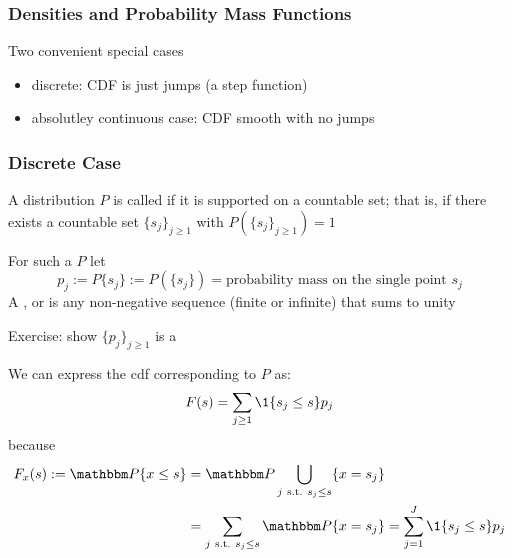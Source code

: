 \begin{frame}

    \frametitle{Densities and Probability Mass Functions}

    Two convenient special cases
    \begin{itemize}
        \item discrete: CDF is just jumps (a step function) 
        \item absolutley continuous case: CDF smooth with no jumps
    \end{itemize}

\end{frame}

\begin{frame}\frametitle{Discrete Case}
    
    \vspace{2em}
    A distribution $P$ is called  if it is supported on a countable
    set; that is, if there exists a countable set $\{s_j\}_{j \geq 1}$ with
    $P(\{s_j\}_{j \geq 1}) = 1$
    
    For such a $P$ let
    \begin{equation*}
        p_j 
        := P\{s_j\} 
        := P(\{s_j\})
        = \text{probability mass on the single point } s_j
    \end{equation*}
    A
    , or  is any non-negative
    sequence (finite or infinite) that sums to unity
    
    Exercise: show $\{p_j\}_{j \geq 1}$ is a
    
\end{frame}

\begin{frame}

    \vspace{2em}
    We can express the {\sc cdf} corresponding
    to $P$ as:
    \begin{equation}
        \label{eq:cdfdrv}
        F(s) = \sum_{j \geq 1} \1\{s_j \leq s\} p_j
    \end{equation}
    because
    \begin{align*}
        F_x(s) := 
        \PP\{x \leq s\}
        & = \PP \bigcup_{j \st s_j \leq s} \{x = s_j\}
        \\
        & = \sum_{j \st s_j \leq s} \PP \{x = s_j\} 
        = \sum_{j=1}^J \1\{s_j \leq s\} p_j
    \end{align*}
    
\end{frame}

